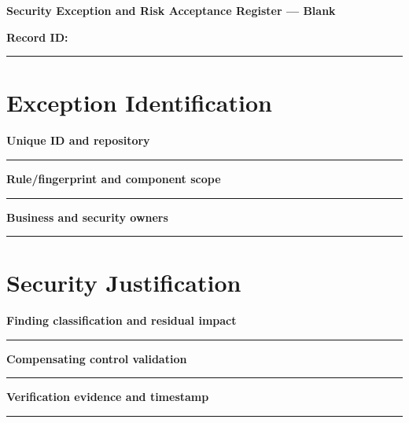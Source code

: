 \documentclass[11pt,letterpaper]{article}
\begin{document}
\begin{center}{\LARGE\bfseries Security Exception and Risk Acceptance Register --- Blank}\par
\vspace{4pt}{\small Print-ready unfilled assessment instrument}\par
\end{center}
\noindent\textbf{Record ID:} \rule{2.6in}{0.4pt}\par
\section{Exception Identification}
\noindent\textbf{Unique ID and repository}\par
\vspace{1.1em}\noindent\rule{0.96\linewidth}{0.4pt}\par\vspace{0.65em}
\noindent\textbf{Rule/fingerprint and component scope}\par
\vspace{1.1em}\noindent\rule{0.96\linewidth}{0.4pt}\par\vspace{0.65em}
\noindent\textbf{Business and security owners}\par
\vspace{1.1em}\noindent\rule{0.96\linewidth}{0.4pt}\par\vspace{0.65em}
\section{Security Justification}
\noindent\textbf{Finding classification and residual impact}\par
\vspace{1.1em}\noindent\rule{0.96\linewidth}{0.4pt}\par\vspace{0.65em}
\noindent\textbf{Compensating control validation}\par
\vspace{1.1em}\noindent\rule{0.96\linewidth}{0.4pt}\par\vspace{0.65em}
\noindent\textbf{Verification evidence and timestamp}\par
\vspace{1.1em}\noindent\rule{0.96\linewidth}{0.4pt}\par\vspace{0.65em}
\end{document}

